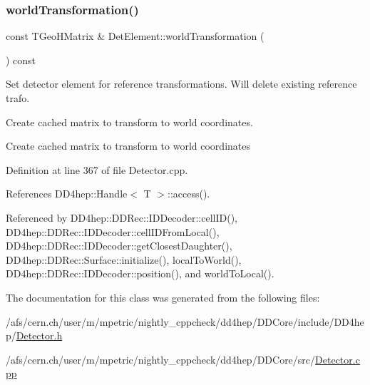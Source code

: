 \subsubsection{\texorpdfstring{world\+Transformation()}{worldTransformation()}}
{\footnotesize\ttfamily const T\+Geo\+H\+Matrix \& Det\+Element\+::world\+Transformation (\begin{DoxyParamCaption}{ }\end{DoxyParamCaption}) const}



Set detector element for reference transformations. Will delete existing reference trafo. 

Create cached matrix to transform to world coordinates.

Create cached matrix to transform to world coordinates 

Definition at line 367 of file Detector.\+cpp.



References D\+D4hep\+::\+Handle$<$ T $>$\+::access().



Referenced by D\+D4hep\+::\+D\+D\+Rec\+::\+I\+D\+Decoder\+::cell\+I\+D(), D\+D4hep\+::\+D\+D\+Rec\+::\+I\+D\+Decoder\+::cell\+I\+D\+From\+Local(), D\+D4hep\+::\+D\+D\+Rec\+::\+I\+D\+Decoder\+::get\+Closest\+Daughter(), D\+D4hep\+::\+D\+D\+Rec\+::\+Surface\+::initialize(), local\+To\+World(), D\+D4hep\+::\+D\+D\+Rec\+::\+I\+D\+Decoder\+::position(), and world\+To\+Local().



The documentation for this class was generated from the following files\+:\begin{DoxyCompactItemize}
\item 
/afs/cern.\+ch/user/m/mpetric/nightly\+\_\+cppcheck/dd4hep/\+D\+D\+Core/include/\+D\+D4hep/\hyperlink{_detector_8h}{Detector.\+h}\item 
/afs/cern.\+ch/user/m/mpetric/nightly\+\_\+cppcheck/dd4hep/\+D\+D\+Core/src/\hyperlink{_detector_8cpp}{Detector.\+cpp}\end{DoxyCompactItemize}
